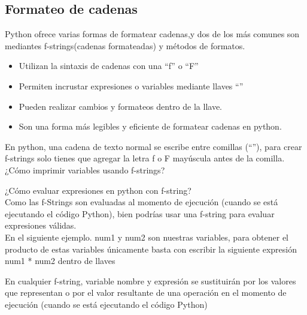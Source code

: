 \subsection{Formateo de cadenas}

Python ofrece varias formas de formatear cadenas,y dos de los más comunes son mediantes f-strings(cadenas formateadas) y métodos de formatos.
\begin{itemize}
    \item Utilizan la sintaxis de cadenas con una “f” o “F” 
    \item Permiten incrustar expresiones o variables mediante llaves ``{}''
    \item Pueden realizar cambios y formateos dentro de la llave.
    \item Son una forma más legibles y eficiente de formatear cadenas en python.
\end{itemize}

En python, una cadena de texto normal se escribe entre comillas (``''), para crear f-strings solo tienes que agregar la letra f o F mayúscula antes de la comilla.\\

\newpage
¿Cómo imprimir variables usando f-strings?

\begin{figure}[h]
    \centering
  \end{figure}

¿Cómo evaluar expresiones en python con f-string?\\

Como las f-Strings son evaluadas al momento de ejecución (cuando se está ejecutando el código Python), bien podrías usar una f-string para evaluar expresiones válidas.\\

En el siguiente ejemplo. num1 y num2 son nuestras variables, para obtener el producto de estas variables únicamente basta con escribir la siguiente expresión num1 * num2 dentro de llaves
\begin{figure}[h]
    \centering
  \end{figure}

En cualquier f-string,  {variable nombre} y {expresión} se sustituirán  por los valores que representan  o por el valor resultante de una operación en el momento de ejecución (cuando se está ejecutando el código Python)
